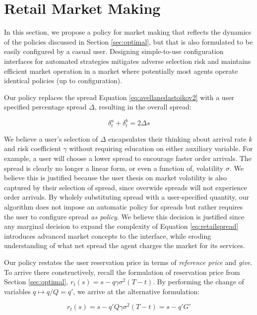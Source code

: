 \documentclass{article}
\begin{document}
\section{Retail Market Making}
\label{sec:retail}

In this section, we propose a policy for market making that reflects the dynamics of the policies discussed in Section \ref{sec:optimal}, but that is also formulated to be easily configured by a casual user. Designing simple-to-use configuration interfaces for automated strategies mitigates adverse selection risk and maintains efficient market operation in a market where potentially most agents operate identical policies (up to configuration).

Our policy replaces the spread Equation \ref{eq:avellanedastoikov2} with a user specified percentage spread $\Delta$, resulting in the overall spread:

\begin{equation}
\label{eq:retailspread}
\delta^a_t + \delta^b_t = 2 \Delta s
\end{equation}

We believe a user's selection of $\Delta$ encapsulates their thinking about arrival rate $k$ and risk coefficient $\gamma$ without requiring education on either auxiliary variable. For example, a user will choose a lower spread to encourage faster order arrivals. The spread is clearly no longer a linear form, or even a function of, volatility $\sigma$. We believe this is justified because the user thesis on market volatility is also captured by their selection of spread, since overwide spreads will not experience order arrivals. By wholely substituting spread with a user-specified quantity, our algorithm does not impose an automatic policy for spreads but rather requires the user to configure spread \emph{as policy}. We believe this decision is justified since any marginal decision to expand the complexity of Equation \ref{eq:retailspread} introduces advanced market concepts to the interface, while eroding understanding of what net spread the agent charges the market for its services.

Our policy restates the user reservation price in terms of \emph{reference price} and \emph{give}. To arrive there constructively, recall the formulation of reservation price from Section \ref{sec:optimal}, $r_t(s) = s - q \gamma \sigma^2(T - t)$. By performing the change of variables $q \mapsto q/Q = q'$, we arrive at the alternative formulation:

\begin{equation}
\label{eq:retailprice}
r_t(s) = s - q' Q \gamma \sigma^2(T - t) = s - q' G'
\end{equation}
\end{document}
